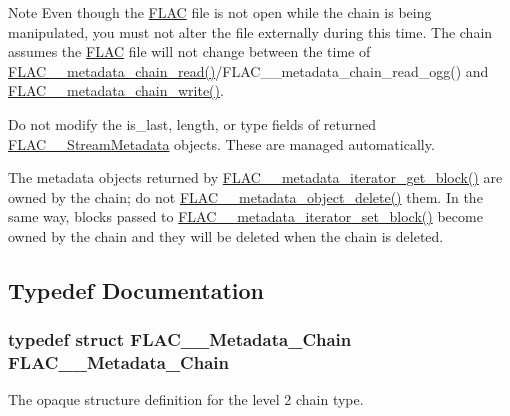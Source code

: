\begin{DoxyNote}{Note}
Even though the \hyperlink{namespace_f_l_a_c}{F\+L\+AC} file is not open while the chain is being manipulated, you must not alter the file externally during this time. The chain assumes the \hyperlink{namespace_f_l_a_c}{F\+L\+AC} file will not change between the time of \hyperlink{group__flac__metadata__level2_gadb7d8e9a82aeb43e256f0a948adf5c45}{F\+L\+A\+C\+\_\+\+\_\+metadata\+\_\+chain\+\_\+read()}/\+F\+L\+A\+C\+\_\+\+\_\+metadata\+\_\+chain\+\_\+read\+\_\+ogg() and \hyperlink{group__flac__metadata__level2_gaa15ead7230217de8e79f4af822cda490}{F\+L\+A\+C\+\_\+\+\_\+metadata\+\_\+chain\+\_\+write()}.

Do not modify the is\+\_\+last, length, or type fields of returned \hyperlink{struct_f_l_a_c_____stream_metadata}{F\+L\+A\+C\+\_\+\+\_\+\+Stream\+Metadata} objects. These are managed automatically.

The metadata objects returned by \hyperlink{group__flac__metadata__level2_ga4a2b00a4312d178a9f55c2e2f8b08904}{F\+L\+A\+C\+\_\+\+\_\+metadata\+\_\+iterator\+\_\+get\+\_\+block()} are owned by the chain; do not \hyperlink{group__flac__metadata__object_ga66bbe27dba68ba77be5af83986a280ea}{F\+L\+A\+C\+\_\+\+\_\+metadata\+\_\+object\+\_\+delete()} them. In the same way, blocks passed to \hyperlink{group__flac__metadata__level2_gab40c33a0bf35a2932a5c13f5230e0d9e}{F\+L\+A\+C\+\_\+\+\_\+metadata\+\_\+iterator\+\_\+set\+\_\+block()} become owned by the chain and they will be deleted when the chain is deleted. 
\end{DoxyNote}


\subsection{Typedef Documentation}
\subsubsection[{\texorpdfstring{F\+L\+A\+C\+\_\+\+\_\+\+Metadata\+\_\+\+Chain}{FLAC__Metadata_Chain}}]{\setlength{\rightskip}{0pt plus 5cm}typedef struct {\bf F\+L\+A\+C\+\_\+\+\_\+\+Metadata\+\_\+\+Chain} {\bf F\+L\+A\+C\+\_\+\+\_\+\+Metadata\+\_\+\+Chain}}\hypertarget{group__flac__metadata__level2_gaec6993c60b88f222a52af86f8f47bfdf}{}\label{group__flac__metadata__level2_gaec6993c60b88f222a52af86f8f47bfdf}
The opaque structure definition for the level 2 chain type. 

